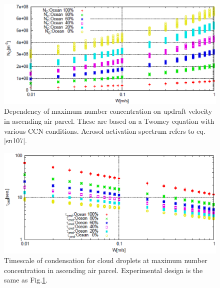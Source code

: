 \begin{figure}[]
\begin{center}
\includegraphics[scale=0.5]{./figure/density_max_num.eps}
\end{center}
\caption{Dependency of maximum number concentration on updraft velocity in ascending air parcel. These are based on a Twomey equation with various CCN conditions. Aerosol activation spectrum refers to eq.\ref{sn107}.}
\label{figsn2-18}
\end{figure}

\begin{figure}[]
\begin{center}
\includegraphics[scale=0.5]{./figure/cond_timescale.eps}
\end{center}
\caption{Timescale of condensation for cloud droplets at maximum number concentration in ascending air parcel. Experimental design is the same as Fig.\ref{figsn2-18}.}
\label{figsn2-19}
\end{figure}

